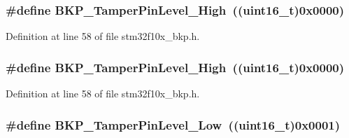 \subsubsection[{\texorpdfstring{B\+K\+P\+\_\+\+Tamper\+Pin\+Level\+\_\+\+High}{BKP_TamperPinLevel_High}}]{\setlength{\rightskip}{0pt plus 5cm}\#define B\+K\+P\+\_\+\+Tamper\+Pin\+Level\+\_\+\+High~(({\bf uint16\+\_\+t})0x0000)}\hypertarget{group___tamper___pin__active__level_gae7203c3c0202cd68d201278c8be2b967}{}\label{group___tamper___pin__active__level_gae7203c3c0202cd68d201278c8be2b967}


Definition at line 58 of file stm32f10x\+\_\+bkp.\+h.

\subsubsection[{\texorpdfstring{B\+K\+P\+\_\+\+Tamper\+Pin\+Level\+\_\+\+High}{BKP_TamperPinLevel_High}}]{\setlength{\rightskip}{0pt plus 5cm}\#define B\+K\+P\+\_\+\+Tamper\+Pin\+Level\+\_\+\+High~(({\bf uint16\+\_\+t})0x0000)}\hypertarget{group___tamper___pin__active__level_gae7203c3c0202cd68d201278c8be2b967}{}\label{group___tamper___pin__active__level_gae7203c3c0202cd68d201278c8be2b967}


Definition at line 58 of file stm32f10x\+\_\+bkp.\+h.

\subsubsection[{\texorpdfstring{B\+K\+P\+\_\+\+Tamper\+Pin\+Level\+\_\+\+Low}{BKP_TamperPinLevel_Low}}]{\setlength{\rightskip}{0pt plus 5cm}\#define B\+K\+P\+\_\+\+Tamper\+Pin\+Level\+\_\+\+Low~(({\bf uint16\+\_\+t})0x0001)}\hypertarget{group___tamper___pin__active__level_gade9fc51f494eddcc4d88679c80fe39ce}{}\label{group___tamper___pin__active__level_gade9fc51f494eddcc4d88679c80fe39ce}



